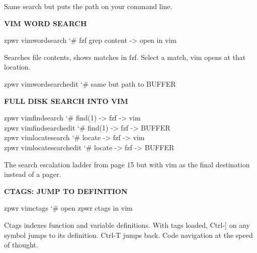 \documentclass[11pt,a4paper,twoside]{book}
\begin{document}
Same search but puts the path on your command line.


\vspace{12pt}
{\bfseries\color{neonyellow} VIM WORD SEARCH}\vspace{4pt}

\begin{codebox}
\color{neongreen}zpwr vimwordsearch          {\char`\#} fzf grep content -> open in vim\\
\end{codebox}

Searches file contents, shows matches in fzf. Select a match, vim opens at that location.

\begin{codebox}
\color{neongreen}zpwr vimwordsearchedit      {\char`\#} same but path to BUFFER\\
\end{codebox}


\vspace{12pt}
{\bfseries\color{neonyellow} FULL DISK SEARCH INTO VIM}\vspace{4pt}

\begin{codebox}
\color{neongreen}zpwr vimfindsearch          {\char`\#} find(1) -> fzf -> vim\\
\color{neongreen}zpwr vimfindsearchedit      {\char`\#} find(1) -> fzf -> BUFFER\\
\color{neongreen}zpwr vimlocatesearch        {\char`\#} locate -> fzf -> vim\\
\color{neongreen}zpwr vimlocatesearchedit    {\char`\#} locate -> fzf -> BUFFER\\
\end{codebox}

The search escalation ladder from page 15 but with vim as the final destination instead of a pager.


\vspace{12pt}
{\bfseries\color{neonyellow} CTAGS: JUMP TO DEFINITION}\vspace{4pt}

\begin{codebox}
\color{neongreen}zpwr vimctags               {\char`\#} open zpwr ctags in vim\\
\end{codebox}

Ctags indexes function and variable definitions. With tags loaded, Ctrl-] on any symbol jumps to its definition. Ctrl-T jumps back. Code navigation at the speed of thought.
\end{document}
